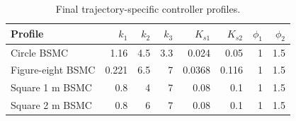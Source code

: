 \begin{table}[!t]
\centering
\caption{Final trajectory-specific controller profiles.}
\label{tab:controller_profiles}
\begin{tabular}{lrrrrrrr}
\hline
Profile & $k_1$ & $k_2$ & $k_3$ & $K_{s1}$ & $K_{s2}$ & $\phi_1$ & $\phi_2$ \\
\hline
Circle BSMC & 1.16 & 4.5 & 3.3 & 0.024 & 0.05 & 1 & 1.5 \\
Figure-eight BSMC & 0.221 & 6.5 & 7 & 0.0368 & 0.116 & 1 & 1.5 \\
Square 1 m BSMC & 0.8 & 4 & 7 & 0.08 & 0.1 & 1 & 1.5 \\
Square 2 m BSMC & 0.8 & 6 & 7 & 0.08 & 0.1 & 1 & 1.5 \\
\hline
\end{tabular}
\end{table}
